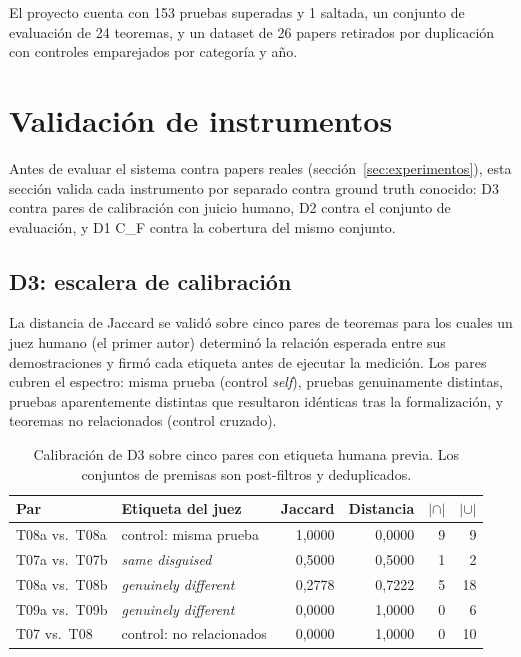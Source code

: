 \documentclass[12pt,a4paper]{article}
\theoremstyle{remark}
\begin{document}
El proyecto cuenta con 153 pruebas superadas y 1 saltada, un conjunto de evaluación de 24 teoremas, y un dataset de 26 papers retirados por duplicación con controles emparejados por categoría y año.


\section{Validación de instrumentos}
\label{sec:instrumentos}

Antes de evaluar el sistema contra papers reales (sección~\ref{sec:experimentos}), esta sección valida cada instrumento por separado contra ground truth conocido: D3 contra pares de calibración con juicio humano, D2 contra el conjunto de evaluación, y D1 C\_F contra la cobertura del mismo conjunto.

\subsection{D3: escalera de calibración}
\label{ssec:d3cal}

La distancia de Jaccard se validó sobre cinco pares de teoremas para los cuales un juez humano (el primer autor) determinó la relación esperada entre sus demostraciones y firmó cada etiqueta antes de ejecutar la medición. Los pares cubren el espectro: misma prueba (control \textit{self}), pruebas genuinamente distintas, pruebas aparentemente distintas que resultaron idénticas tras la formalización, y teoremas no relacionados (control cruzado).

\begin{table}[htbp]
\centering
\small
\setlength{\tabcolsep}{5pt}
\begin{tabular}{llrrrr}
\toprule
Par & Etiqueta del juez & Jaccard & Distancia & $|\cap|$ & $|\cup|$ \\
\midrule
T08a vs.\ T08a & control: misma prueba      & 1{,}0000 & 0{,}0000 & 9 & 9 \\
T07a vs.\ T07b & \textit{same disguised}    & 0{,}5000 & 0{,}5000 & 1 & 2 \\
T08a vs.\ T08b & \textit{genuinely different} & 0{,}2778 & 0{,}7222 & 5 & 18 \\
T09a vs.\ T09b & \textit{genuinely different} & 0{,}0000 & 1{,}0000 & 0 & 6 \\
T07 vs.\ T08   & control: no relacionados   & 0{,}0000 & 1{,}0000 & 0 & 10 \\
\bottomrule
\end{tabular}
\caption{Calibración de D3 sobre cinco pares con etiqueta humana previa. Los conjuntos de premisas son post-filtros y deduplicados.}
\label{tab:d3cal}
\end{table}
\end{document}
